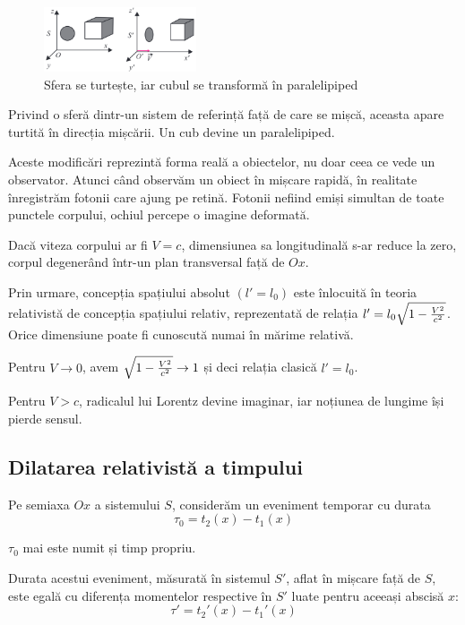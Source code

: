 \begin{figure}
    \centering
    \includegraphics[width=0.4\textwidth]{fig/turtit}
    \caption{Sfera se turtește, iar cubul \linebreak se transformă în paralelipiped}
\end{figure}

Privind o sferă dintr-un sistem de referință față de care se mișcă, aceasta
apare turtită în direcția mișcării. Un cub devine un paralelipiped.

Aceste modificări reprezintă forma reală a obiectelor, nu doar ceea ce vede un
observator. Atunci când observăm un obiect în mișcare rapidă, în realitate
înregistrăm fotonii care ajung pe retină. Fotonii nefiind emiși
simultan de toate punctele corpului, ochiul percepe o imagine deformată.

Dacă viteza corpului ar fi \( V = c \), dimensiunea sa longitudinală s-ar reduce
la zero, corpul degenerând într-un plan transversal față de $Ox$.

Prin urmare, concepția spațiului absolut \( \left( l' = l_0 \right) \) este
înlocuită în teoria relativistă de concepția spațiului relativ, reprezentată
de relația \( l' = l_0 \sqrt{1 - \frac{V^2}{c^2}} \). Orice dimensiune poate fi cunoscută
numai în mărime relativă.

Pentru \( V \rightarrow 0 \), avem \( \sqrt{1 - \frac{V^2}{c^2}} \rightarrow 1 \) și deci
relația clasică \( l' = l_0 \).

Pentru \( V > c \), radicalul lui Lorentz devine imaginar, iar noțiunea de lungime
își pierde sensul.

\pagebreak

\subsection{Dilatarea relativistă a timpului}
Pe semiaxa $Ox$ a sistemului $S$, considerăm un eveniment temporar cu durata
\[ \tau_0 = t_2(x) - t_1(x) \]

$\tau_0$ mai este numit și timp propriu.

Durata acestui eveniment, măsurată în sistemul $S'$, aflat în mișcare față de
$S$, este egală cu diferența momentelor respective în $S'$ luate pentru aceeași
abscisă $x$:
\[ \tau' = t_2'(x) - t_1'(x) \]


